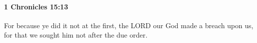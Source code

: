 
		\paragraph{1 Chronicles 15:13} %
			\label{1CHRONICLES-15-13}

			For because ye did it not at the first, the LORD our God made a breach upon us, for that we sought him not after the due order.


